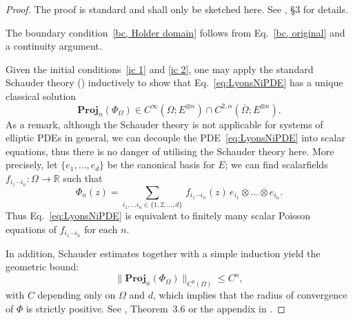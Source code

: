 \documentclass[11pt,a4paper,english,reqno]{amsart}
\theoremstyle{plain}
\newcommand{\R}{\mathbb{R}}
\newcommand{\1}{\mathbbm{1}}
\newcommand{\proj}{\mathbf{Proj}}
\begin{document}
\begin{proof}%

The proof is standard and shall only be sketched here. See  \cite{lyons2015expected}, \S 3 for details. 


The boundary condition~\eqref{bc, Holder domain} follows from Eq.~\eqref{bc, original} and a continuity argument. 

Given the initial conditions~\eqref{ic 1} and \eqref{ic 2}, one may apply the standard Schauder theory (\cite{pde, gt}) inductively to show that  Eq.~\eqref{eq:LyonsNiPDE} has a  unique classical solution
\begin{equation*}
    \proj_{n}(\Phi_{\Omega}) \in C^\infty\left(\Omega; E^{\otimes n}\right) \cap C^{2,\alpha}\left(\overline{\Omega}; E^{\otimes n}\right).
\end{equation*}
As a remark, although the Schauder theory is not applicable for systems of elliptic PDEs in general, we can decouple the PDE~\eqref{eq:LyonsNiPDE} into scalar equations, thus there is no danger of utilising the Schauder theory here. More precisely, let $\{e_1,\ldots,e_d\}$ be the canonical basis for $E$; we can find scalarfields $f_{i_1\cdots i_n}:\Omega\to\R$ such that $$\Phi_n(z) = \sum_{i_1, \ldots i_n \in \{1,2,\ldots, d\}}\, f_{i_1\cdots i_n}(z) \, e_{i_1} \otimes \ldots \otimes e_{i_n}.$$ Thus Eq.~\eqref{eq:LyonsNiPDE} is equivalent to finitely many scalar Poisson equations of $f_{i_1\cdots i_n}$ for each $n$.

In addition, Schauder estimates together with a simple induction yield the geometric bound:
\begin{equation}
\label{geom bd}
    \|\proj_{n}(\Phi_{\Omega})\|_{C^0(\Omega)} \leq C^n,
\end{equation}
with $C$ depending only on  $\Omega$ and $d$, which implies that the radius of convergence of $\Phi$ is strictly positive. See  \cite{lyons2015expected}, Theorem~3.6 or the appendix in  \cite{boedihardjo2021expected}.    \end{proof}
\end{document}
